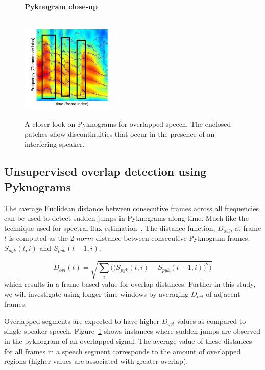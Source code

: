 {\begin{figure}[h!]
	\centering
	\vspace{1mm}
	\textbf{Pyknogram close-up}\par\medskip
	\vspace{-1mm}
	\includegraphics[height =2.0in, width=0.4\textwidth]{figures/co-channel_pyknogram-crop}
	\vspace{-1mm}
	\caption{A closer look on Pyknograms for overlapped speech. The enclosed patches show discontinuities that occur in the presence of an interfering speaker.}
	\vspace{-1mm}
	\label{fig:pyknograms_for_overlaps}
\end{figure}

\newpage
\subsection{Unsupervised overlap detection using Pyknograms}
\label{sssec:unsupervised_ovl_det_pykno}
The average Euclidean distance between consecutive frames across all frequencies can be used to detect sudden jumps in Pyknograms along time. 
Much like the technique used for spectral flux estimation~\cite{Rossignol_spectralflux}. 
The distance function, $D_{ovl}$, at frame $t$ is computed as the $2$-$norm$ distance between consecutive Pyknogram frames, $S_{pyk}(t,i)$ and $S_{pyk}(t-1,i)$. 

\begin{equation}
\label{eq:ovl_det_score}
D_{ovl}(t) = \sqrt{\sum_i\Big(\big(S_{pyk}(t,i)-S_{pyk}(t-1,i)\big)^2\Big)}
\end{equation}
which results in a frame-based value for overlap distances. 
Further in this study, we will investigate using longer time windows by averaging $D_{ovl}$ of adjacent frames. 


Overlapped segments are expected to have higher $D_{ovl}$ values as compared to single-speaker speech. 
Figure~\ref{fig:pyknograms_for_overlaps} shows instances where sudden jumps are observed in the pyknogram of an overlapped signal. 
The average value of these distances for all frames in a speech segment corresponds to the amount of overlapped regions (higher values are associated with greater overlap). 


}
